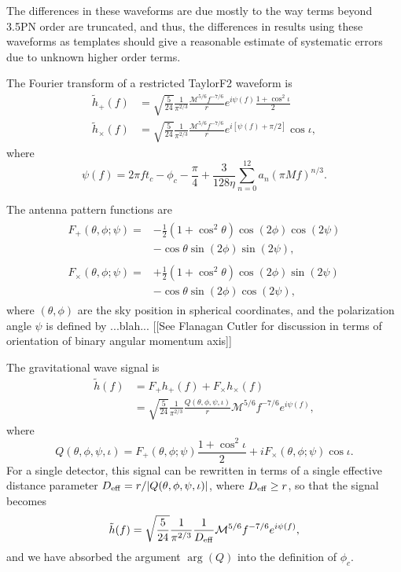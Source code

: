 \documentclass[twocolumn,prd,amssymb,aps,nofootinbib,showpacs,epsf]{revtex4}
\begin{document}
The differences in these waveforms are due mostly to the way terms beyond 3.5PN order are truncated, and thus, the differences in results using these waveforms as templates should give a reasonable estimate of systematic errors due to unknown higher order terms.

The Fourier transform of a restricted TaylorF2 waveform is 
\begin{align}
\tilde h_+(f) &= \sqrt{\frac{5}{24}}\frac{1}{\pi^{2/3}} \frac{\mathcal{M}^{5/6} f^{-7/6}}{r} e^{i\psi(f)} \frac{1+\cos^2\iota}{2} \\
\tilde h_\times(f) &= \sqrt{\frac{5}{24}}\frac{1}{\pi^{2/3}} \frac{\mathcal{M}^{5/6} f^{-7/6}}{r} e^{i[\psi(f) + \pi/2]} \cos\iota,
\end{align}
where
\begin{equation}
\psi(f) = 2\pi f t_c - \phi_c - \frac{\pi}{4} + \frac{3}{128\eta} \sum_{n=0}^{12} a_n (\pi M f)^{n/3}.
\end{equation}

The antenna pattern functions are
\begin{align}
\begin{split}
F_+(\theta, \phi; \psi) =& - \frac{1}{2}(1+\cos^2\theta) \cos(2\phi) \cos(2\psi) \\
& - \cos\theta \sin(2\phi) \sin(2\psi),
\end{split}\\
\begin{split}
F_\times(\theta, \phi; \psi) =& + \frac{1}{2}(1+\cos^2\theta) \cos(2\phi) \sin(2\psi) \\
& - \cos\theta \sin(2\phi) \cos(2\psi),
\end{split}
\end{align}
where $(\theta, \phi)$ are the sky position in spherical coordinates, and the polarization angle $\psi$ is defined by ...blah... [[See Flanagan Cutler for discussion in terms of orientation of binary angular momentum axis]]

The gravitational wave signal is
\begin{align}
\tilde h(f) &=  F_+ h_+(f) + F_\times h_\times(f) \\
&= \sqrt{\frac{5}{24}}\frac{1}{\pi^{2/3}} \frac{Q(\theta, \phi, \psi, \iota)}{r} \mathcal{M}^{5/6} f^{-7/6} e^{i\psi(f)},
\end{align}
where
\begin{equation}
Q(\theta, \phi, \psi, \iota) = F_+(\theta, \phi; \psi) \frac{1+\cos^2\iota}{2} + i F_\times(\theta, \phi; \psi) \cos\iota.
\end{equation}
For a single detector, this signal can be rewritten in terms of a single effective distance parameter $D_{\rm eff} = r/|Q(\theta, \phi, \psi, \iota)|$, where $D_{\rm eff} \ge r$, so that the signal becomes
\begin{equation}
\tilde h(f) =  \sqrt{\frac{5}{24}}\frac{1}{\pi^{2/3}}  \frac{1}{D_{\rm eff}} \mathcal{M}^{5/6} f^{-7/6} e^{i\psi(f)},
\end{equation}
and we have absorbed the argument $\arg(Q)$ into the definition of $\phi_c$.
\end{document}
